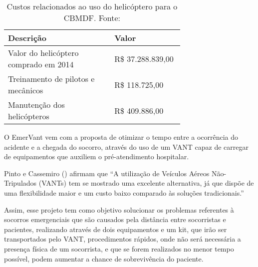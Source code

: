 \begin{table*}
\caption{Custos relacionados ao uso do helicóptero para o CBMDF. Fonte: \cite{bombeiro}}
\label{tab:custos}
\centering
  \begin{tabular}{p{0.45\linewidth}p{0.25\linewidth}}
  \hline
  Descrição & Valor\\
  \hline
  Valor do helicóptero comprado em 2014 & R\$ 37.288.839,00 \\

  Treinamento de pilotos e mecânicos & R\$ 118.725,00\\
  
  Manutenção dos helicópteros & R\$ 409.886,00 \\

  \hline
  \end{tabular}
\end{table*}

O  EmerVant  vem  com a  proposta  de otimizar  o tempo  entre  a ocorrência do acidente  e a chegada  do socorro, através do uso de um VANT capaz de carregar de equipamentos que auxiliem o pré-atendimento hospitalar. 

Pinto e Cassemiro (\citeyear{pinto}) afirmam que ``A utilização de Veículos Aéreos Não-Tripulados (VANTs) tem se mostrado uma excelente alternativa, já que dispõe de uma flexibilidade maior e um custo baixo comparado às soluções tradicionais.''

Assim, esse projeto tem como objetivo solucionar os problemas referentes à socorros emergenciais que são causados pela distância entre socorristas e pacientes, realizando através de dois equipamentos e um kit, que irão ser transportados pelo VANT, procedimentos rápidos, onde não será necessária a presença física de um socorrista, e que se forem realizados no menor tempo possível, podem aumentar a chance de sobrevivência do paciente.

